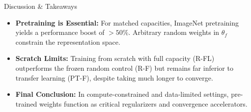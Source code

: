 \documentclass[aspectratio=169]{beamer}
\begin{document}
\begin{frame}{Discussion \& Takeaways}
  \begin{itemize}
    \item \textbf{Pretraining is Essential:} For matched capacities, ImageNet pretraining yields a performance boost of $>50\%$. Arbitrary random weights in $\theta_f$ constrain the representation space.
    \item \textbf{Scratch Limits:} Training from scratch with full capacity (R-FL) outperforms the frozen random control (R-F) but remains far inferior to transfer learning (PT-F), despite taking much longer to converge.
    \item \textbf{Final Conclusion:} In compute-constrained and data-limited settings, pre-trained weights function as critical regularizers and convergence accelerators.
  \end{itemize}
\end{frame}
\end{document}
